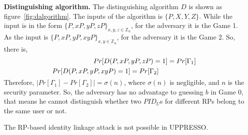 {\noindent\textbf{Distinguishing algorithm.} The distinguishing algorithm $D$ is shown as figure~\ref{fig:dalgorithm}. 
The inputs of the algorithm is $\{P,X,Y,Z\}$. While the input is in the form $\{P,xP,yP,zP\}_{x,y,z \in \mathbb{Z}_n}$, for the adversary it is the Game 1. As the input is $\{P,xP,yP,xyP\}_{x,y \in \mathbb{Z}_n}$, for the adversary it is the Game 2. So, there is,
\vspace{-\topsep}
\begin{multline*}
   \ \ \ \ \ \ \ \ \ \ \ \ \ \ \ \ \  Pr[D(P,xP,yP,zP)=1]=Pr[{\Gamma_1}]\\
   Pr[D(P,xP,yP,xyP)=1]=Pr[{\Gamma_2}]\ \ \ \ \ \ \ \ \ \ \ \ \ \ \ \ \ \ 
   \vspace{-\topsep}
\end{multline*}

Therefore, $|Pr[\Gamma_1]-Pr[\Gamma_2]|=\sigma(n)$, where $\sigma(n)$ is negligible, and $n$ is the security parameter. So, the adversary has no advantage to guessing $b$ in Game 0, that means he cannot distinguish whether two $PID_U$s for different RPs belong to the same user or not. 

The RP-based identity linkage attack is not possible in UPPRESSO.

}

